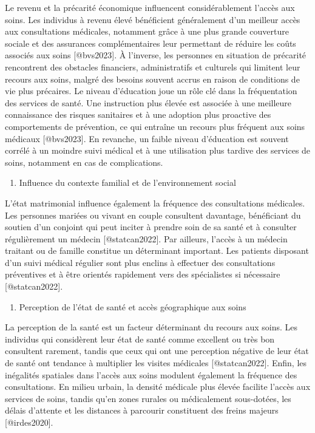 \documentclass[
]{article}
\providecommand{\tightlist}{%
  \setlength{\itemsep}{0pt}\setlength{\parskip}{0pt}}
\begin{document}
Le revenu et la précarité économique influencent considérablement
l'accès aux soins. Les individus à revenu élevé bénéficient généralement
d'un meilleur accès aux consultations médicales, notamment grâce à une
plus grande couverture sociale et des assurances complémentaires leur
permettant de réduire les coûts associés aux soins {[}@bvs2023{]}. À
l'inverse, les personnes en situation de précarité rencontrent des
obstacles financiers, administratifs et culturels qui limitent leur
recours aux soins, malgré des besoins souvent accrus en raison de
conditions de vie plus précaires. Le niveau d'éducation joue un rôle clé
dans la fréquentation des services de santé. Une instruction plus élevée
est associée à une meilleure connaissance des risques sanitaires et à
une adoption plus proactive des comportements de prévention, ce qui
entraîne un recours plus fréquent aux soins médicaux {[}@bvs2023{]}. En
revanche, un faible niveau d'éducation est souvent corrélé à un moindre
suivi médical et à une utilisation plus tardive des services de soins,
notamment en cas de complications.

\begin{enumerate}
\def\labelenumi{\arabic{enumi}.}
\setcounter{enumi}{2}
\tightlist
\item
  Influence du contexte familial et de l'environnement social
\end{enumerate}

L'état matrimonial influence également la fréquence des consultations
médicales. Les personnes mariées ou vivant en couple consultent
davantage, bénéficiant du soutien d'un conjoint qui peut inciter à
prendre soin de sa santé et à consulter régulièrement un médecin
{[}@statcan2022{]}. Par ailleurs, l'accès à un médecin traitant ou de
famille constitue un déterminant important. Les patients disposant d'un
suivi médical régulier sont plus enclins à effectuer des consultations
préventives et à être orientés rapidement vers des spécialistes si
nécessaire {[}@statcan2022{]}.

\begin{enumerate}
\def\labelenumi{\arabic{enumi}.}
\setcounter{enumi}{3}
\tightlist
\item
  Perception de l'état de santé et accès géographique aux soins
\end{enumerate}

La perception de la santé est un facteur déterminant du recours aux
soins. Les individus qui considèrent leur état de santé comme excellent
ou très bon consultent rarement, tandis que ceux qui ont une perception
négative de leur état de santé ont tendance à multiplier les visites
médicales {[}@statcan2022{]}. Enfin, les inégalités spatiales dans
l'accès aux soins modulent également la fréquence des consultations. En
milieu urbain, la densité médicale plus élevée facilite l'accès aux
services de soins, tandis qu'en zones rurales ou médicalement
sous-dotées, les délais d'attente et les distances à parcourir
constituent des freins majeurs {[}@irdes2020{]}.
\end{document}
